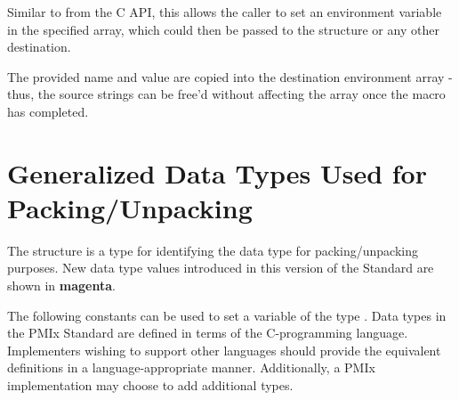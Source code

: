 \descr

Similar to  from the C API, this allows the caller to set an environment variable in the specified  array, which could then be passed to the  structure or any other destination.

\adviceuserstart
The provided name and value are copied into the destination environment array - thus, the source strings can be free'd without affecting the array once the macro has completed.
\adviceuserend


\section{Generalized Data Types Used for Packing/Unpacking}

The  structure is a  type for identifying the data type for packing/unpacking purposes. New data type values introduced in this version of the Standard are shown in \textbf{\color{magenta}magenta}.

\adviceimplstart
The following constants can be used to set a variable of the type . Data types in the \ac{PMIx} Standard are defined in terms of the C-programming language. Implementers wishing to support other languages should provide the equivalent definitions in a language-appropriate manner. Additionally, a PMIx implementation may choose to add additional types.
\adviceimplend

